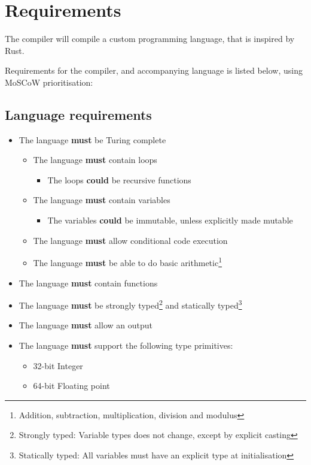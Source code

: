 \newpage
\section{Requirements}
\label{sec:Requirements}
The compiler will compile a custom programming language, that is inspired by Rust.

Requirements for the compiler, and accompanying language is listed below, using MoSCoW prioritisation:

\subsection{Language requirements} %

\begin{itemize}
\item The language \textbf{must} be Turing complete
\begin{itemize}
\item The language \textbf{must} contain loops
\begin{itemize}
\item The loops \textbf{could} be recursive functions
\end{itemize}
\item The language \textbf{must} contain variables
\begin{itemize}
\item The variables \textbf{could} be immutable, unless explicitly made mutable
\end{itemize}
\item The language \textbf{must} allow conditional code execution
\item The language \textbf{must} be able to do basic arithmetic\footnote{Addition, subtraction, multiplication, division and modulus}
\end{itemize}
\item The language \textbf{must} contain functions
\item The language \textbf{must} be strongly typed\footnote{Strongly typed: Variable types does not change, except by explicit casting} and statically typed\footnote{Statically typed: All variables must have an explicit type at initialisation}
\item The language \textbf{must} allow an output
\item The language \textbf{must} support the following type primitives:
\begin{itemize}
\item 32-bit Integer
\item 64-bit Floating point

\end{itemize}
\end{itemize}
